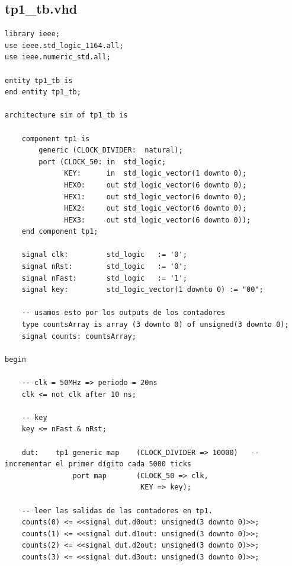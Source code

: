 \documentclass[a4paper]{article}
\begin{document}
\subsection{tp1\_tb.vhd}
\begin{verbatim}
library ieee;
use ieee.std_logic_1164.all;
use ieee.numeric_std.all;

entity tp1_tb is
end entity tp1_tb;

architecture sim of tp1_tb is

    component tp1 is
        generic (CLOCK_DIVIDER:  natural);
        port (CLOCK_50: in  std_logic;
              KEY:      in  std_logic_vector(1 downto 0);
              HEX0:     out std_logic_vector(6 downto 0);
              HEX1:     out std_logic_vector(6 downto 0);
              HEX2:     out std_logic_vector(6 downto 0);
              HEX3:     out std_logic_vector(6 downto 0));
    end component tp1;

    signal clk:         std_logic   := '0';
    signal nRst:        std_logic   := '0';
    signal nFast:       std_logic   := '1';
    signal key:         std_logic_vector(1 downto 0) := "00";

    -- usamos esto por los outputs de los contadores
    type countsArray is array (3 downto 0) of unsigned(3 downto 0);
    signal counts: countsArray;

begin

    -- clk = 50MHz => periodo = 20ns
    clk <= not clk after 10 ns;

    -- key
    key <= nFast & nRst;

    dut:    tp1 generic map    (CLOCK_DIVIDER => 10000)   -- incrementar el primer dígito cada 5000 ticks
                port map       (CLOCK_50 => clk,
                                KEY => key);

    -- leer las salidas de las contadores en tp1.
    counts(0) <= <<signal dut.d0out: unsigned(3 downto 0)>>;
    counts(1) <= <<signal dut.d1out: unsigned(3 downto 0)>>;
    counts(2) <= <<signal dut.d2out: unsigned(3 downto 0)>>;
    counts(3) <= <<signal dut.d3out: unsigned(3 downto 0)>>;


\end{verbatim}
\end{document}
